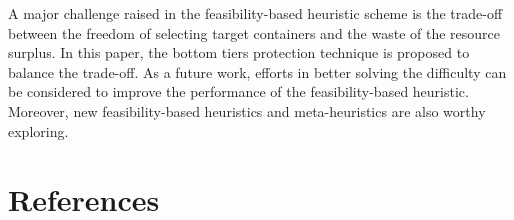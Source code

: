 \documentclass[review,3p,times,12pt,number]{elsarticle}\usepackage{amsmath}\usepackage{amssymb}
\begin{document}
A major challenge raised in the feasibility-based heuristic scheme is the trade-off between the freedom of selecting target containers and the waste of the resource surplus. In this paper, the bottom tiers protection technique is proposed to balance the trade-off. As a future work, efforts in better solving the difficulty can be considered to improve the performance of the feasibility-based heuristic. Moreover, new feasibility-based heuristics and meta-heuristics are also worthy exploring.


\section*{References}

%


\end{document}
